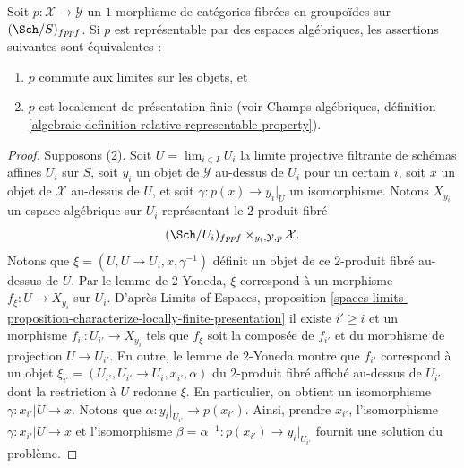 \begin{lemma}
\label{lemma-representable-by-spaces-limit-preserving}
Soit $p : \mathcal{X} \to \mathcal{Y}$ un $1$-morphisme de catégories
fibrées en groupoïdes sur $(\Sch/S)_{fppf}$. Si $p$ est
représentable par des espaces algébriques, les assertions suivantes sont équivalentes :
\begin{enumerate}
\item $p$ commute aux limites sur les objets, et
\item $p$ est localement de présentation finie (voir
Champs algébriques,
définition \ref{algebraic-definition-relative-representable-property}).
\end{enumerate}
\end{lemma}

\begin{proof}
Supposons (2). Soit $U = \lim_{i \in I} U_i$ la limite projective filtrante
de schémas affines $U_i$ sur $S$, soit $y_i$ un objet de $\mathcal{Y}$
au-dessus de $U_i$ pour un certain $i$, soit $x$ un objet de $\mathcal{X}$ au-dessus de $U$,
et soit $\gamma : p(x) \to y_i|_U$ un isomorphisme. Notons
$X_{y_i}$ un espace algébrique sur $U_i$ représentant le $2$-produit
fibré
$$
(\Sch/U_i)_{fppf} \times_{y_i, \mathcal{Y}, p} \mathcal{X}.
$$
Notons que $\xi = (U, U \to U_i, x, \gamma^{-1})$ définit un objet de
ce $2$-produit fibré au-dessus de $U$. Par le lemme de $2$-Yoneda, $\xi$ correspond
à un morphisme $f_\xi : U \to X_{y_i}$ sur $U_i$. D'après
Limits of Espaces, proposition
\ref{spaces-limits-proposition-characterize-locally-finite-presentation}
il existe $i' \geq i$ et un morphisme $f_{i'} : U_{i'} \to X_{y_i}$
tels que $f_\xi$ soit la composée de $f_{i'}$ et du morphisme de
projection $U \to U_{i'}$. En outre, le lemme de $2$-Yoneda montre que
$f_{i'}$ correspond à un objet
$\xi_{i'} = (U_{i'}, U_{i'} \to U_i, x_{i'}, \alpha)$
du $2$-produit fibré affiché au-dessus de $U_{i'}$, dont la restriction à
$U$ redonne $\xi$. En particulier, on obtient un isomorphisme
$\gamma : x_{i'}|U \to x$. Notons que $\alpha : y_i|_{U_{i'}} \to p(x_{i'})$.
Ainsi, prendre $x_{i'}$, l'isomorphisme
$\gamma : x_{i'}|U \to x$ et l'isomorphisme
$\beta = \alpha^{-1} : p(x_{i'}) \to y_i|_{U_{i'}}$
fournit une solution du problème.


\end{proof}
